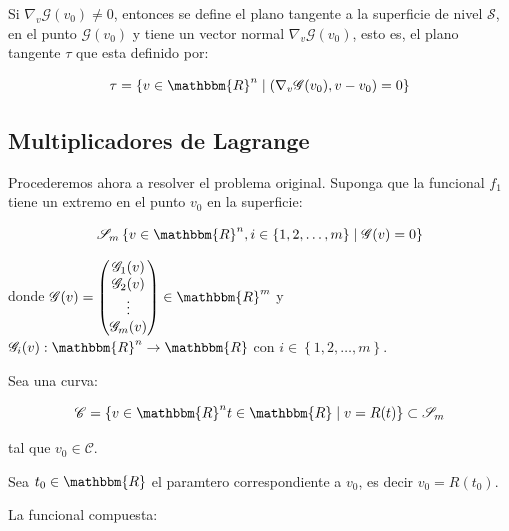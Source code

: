                 Si $\nabla_v \mathscr{G}(v_0) \ne 0$, entonces se define el plano tangente a la superficie de nivel $\mathscr{S}$, en el punto $\mathscr{G}(v_0)$ y tiene un vector normal $\nabla_v \mathscr{G}(v_0)$, esto es, el plano tangente $\tau$ que esta definido por:

                \begin{equation}
                    \tau = \left\{ v \in \mathbbm{R}^n \mid \left( \nabla_v \mathscr{G}(v_0), v - v_0 \right) = 0 \right\}
                \end{equation}


        \subsection{Multiplicadores de Lagrange}

            Procederemos ahora a resolver el problema original. Suponga que la funcional $f_1$ tiene un extremo en el punto $v_0$ en la superficie:

            \begin{equation}
                \mathscr{S}_m \left\{ v \in \mathbbm{R}^n, i \in \left\{ 1, 2, \dots, m \right\} \mid \mathscr{G}(v) = 0 \right\}
            \end{equation}

            donde $\mathscr{G}(v) = \begin{pmatrix} \mathscr{G}_1(v) \\ \mathscr{G}_2(v) \\ \vdots \\ \mathscr{G}_m(v) \end{pmatrix} \in \mathbbm{R}^m$
                y $\mathscr{G}_i(v):\mathbbm{R}^n \to \mathbbm{R}$
                con $i \in \left\{ 1,2,\dots,m \right\}$.

            Sea una curva:

            \begin{equation}
                \mathscr{C} = \left\{ v\in \mathbbm{R}^n t \in \mathbbm{R} \mid v = R(t) \right\} \subset \mathscr{S}_m
            \end{equation}

            tal que $v_0 \in \mathscr{C}$.

            Sea $t_0 \in \mathbbm{R}$ el paramtero correspondiente a $v_0$, es decir $v_0 = R(t_0)$.

            La funcional compuesta:

